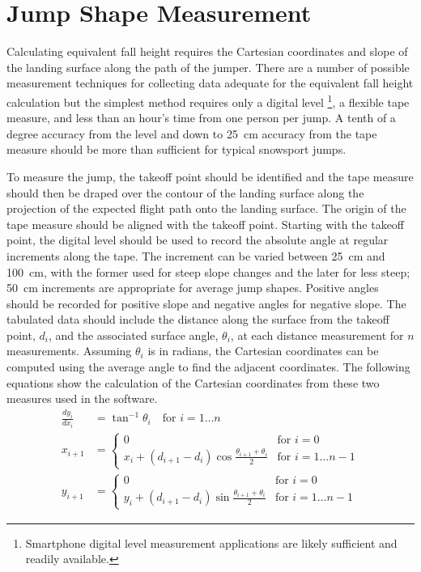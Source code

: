 \documentclass[smallextended]{svjour3}       %
\begin{document}
\section{Jump Shape Measurement}
\label{sec:jump-shape-measurement}
%
Calculating equivalent fall height requires the Cartesian coordinates and slope
of the landing surface along the path of the jumper. There are a number of
possible measurement techniques for collecting data adequate for the equivalent
fall height calculation but the simplest method requires only a digital level
\footnote{Smartphone digital level measurement applications are likely
sufficient and readily available.}, a flexible tape measure, and less than an
hour's time from one person per jump. A tenth of a degree accuracy from the
level and down to 25~\si{\centi\meter} accuracy from the tape measure should be
more than sufficient for typical snowsport jumps.

To measure the jump, the takeoff point should be identified and the tape
measure should then be draped over the contour of the landing surface along the
projection of the expected flight path onto the landing surface. The origin of
the tape measure should be aligned with the takeoff point. Starting with the
takeoff point, the digital level should be used to record the absolute angle at
regular increments along the tape. The increment can be varied between
25~\si{\centi\meter} and 100~\si{\centi\meter}, with the former used for steep
slope changes and the later for less steep; 50~\si{\centi\meter} increments are
appropriate for average jump shapes. Positive angles should be recorded for
positive slope and negative angles for negative slope. The tabulated data
should include the distance along the surface from the takeoff point, $d_i$,
and the associated surface angle, $\theta_i$, at each distance measurement for
$n$ measurements. Assuming $\theta_i$ is in radians, the Cartesian coordinates
can be computed using the average angle to find the adjacent coordinates. The
following equations show the calculation of the Cartesian coordinates from
these two measures used in the software.
%
\begin{align}
  \frac{dy_i}{dx_i} & = \tan^{-1}{\theta_i} \quad \text{for } i=1\ldots n \\
  x_{i + 1} & =
  \begin{cases}
    0 & \text{for } i=0 \\
    x_i + (d_{i+1} - d_i)\cos{\frac{\theta_{i+1} + \theta_i}{2}} &  \text{for }
    i=1\ldots n-1
  \end{cases} \\
  y_{i + 1} & =
  \begin{cases}
    0 & \text{for } i=0 \\
    y_i + (d_{i+1} - d_i)\sin{\frac{\theta_{i+1} + \theta_i}{2}} &  \text{for }
    i=1\ldots n-1
  \end{cases}
\end{align}
\end{document}
